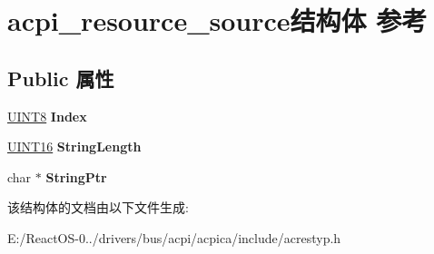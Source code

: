 \hypertarget{structacpi__resource__source}{}\section{acpi\+\_\+resource\+\_\+source结构体 参考}
\label{structacpi__resource__source}
\subsection*{Public 属性}
\begin{DoxyCompactItemize}
\item 
\mbox{\label{structacpi__resource__source_ab4f3489a7302fab72b4be230b62cd5c4}} 
\hyperlink{_processor_bind_8h_ab27e9918b538ce9d8ca692479b375b6a}{U\+I\+N\+T8} {\bfseries Index}
\item 
\mbox{\label{structacpi__resource__source_a5e9b42097f5dd68482a2b89708033597}} 
\hyperlink{_processor_bind_8h_a09f1a1fb2293e33483cc8d44aefb1eb1}{U\+I\+N\+T16} {\bfseries String\+Length}
\item 
\mbox{\label{structacpi__resource__source_ab14b79f8e56c7b042a930f905b920492}} 
char $\ast$ {\bfseries String\+Ptr}
\end{DoxyCompactItemize}


该结构体的文档由以下文件生成\+:\begin{DoxyCompactItemize}
\item 
E\+:/\+React\+O\+S-\/0../drivers/bus/acpi/acpica/include/acrestyp.\+h\end{DoxyCompactItemize}
